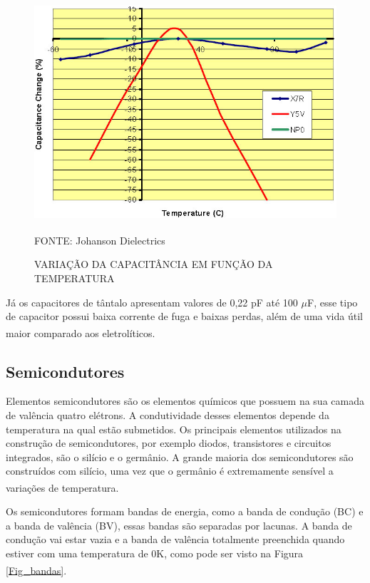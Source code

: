 \documentclass[
	12pt,				%
	openright,			%
	oneside,			%
	a4paper,			%
	english,			%
	french,				%
	spanish,			%
	brazil,				%
	oldfontcommands
	]{abntex2}
\begin{document}
	\begin{figure}[th]
		\caption{VARIAÇÃO DA CAPACITÂNCIA EM FUNÇÃO DA TEMPERATURA}
		\label{Fig_Cap_Temp}
		\centering
		\includegraphics[width=1.0\linewidth]{./figs/y5v}
			
		\begin{small}
			FONTE: Johanson Dielectrics\textsuperscript{\cite{y5v}}
		\end{small}		
	\end{figure}
	\pagebreak

	Já os capacitores de tântalo apresentam valores de 0,22 pF até 100 $\mu$F, esse tipo de capacitor possui baixa corrente de fuga e baixas perdas, além de uma vida útil maior comparado aos eletrolíticos.\textsuperscript{\cite{x7r}}

\subsection[Semicondutores]{Semicondutores}

	Elementos semicondutores são os elementos químicos que possuem na sua camada de valência quatro elétrons. A condutividade desses elementos depende da temperatura na qual estão submetidos. Os principais elementos utilizados na construção de semicondutores, por exemplo diodos, transistores e circuitos integrados, são o silício e o germânio. A grande maioria dos semicondutores são construídos com silício, uma vez que o germânio é extremamente sensível a variações de temperatura.\textsuperscript{\cite{semicondutores}}
	
	Os semicondutores formam bandas de energia, como a banda de condução (BC) e a banda de valência (BV), essas bandas são separadas por lacunas. A banda de condução vai estar vazia e a banda de valência totalmente preenchida quando estiver com uma temperatura de 0K, como pode ser visto na Figura \ref{Fig_bandas}.\textsuperscript{\cite{semicondutores2}}
	
\end{document}
